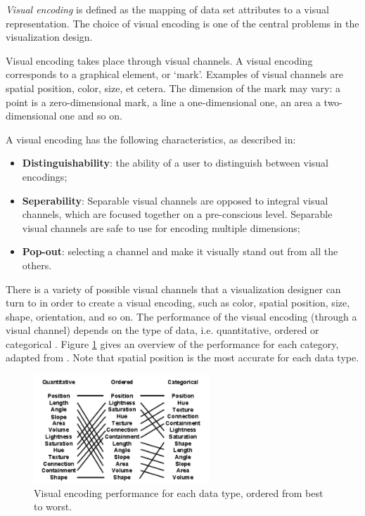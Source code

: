 \emph{Visual encoding} is defined as the mapping of data set attributes to a visual representation. The choice of visual encoding is one of the central problems in the visualization design\cite{shirley:2009}.

Visual encoding takes place through visual channels. A visual encoding corresponds to a graphical element, or ‘mark’. Examples of visual channels are spatial position, color, size, et cetera. The dimension of the mark may vary: a point is a zero-dimensional mark, a line a one-dimensional one, an area a two-dimensional one and so on.

A visual encoding has the following characteristics, as described in\cite{shirley:2009}:

\begin{itemize}
	\item \textbf{Distinguishability}: the ability of a user to distinguish between visual encodings;
	\item \textbf{Seperability}: Separable visual channels are opposed to integral visual channels, which are focused together on a pre-conscious level. Separable visual channels are safe to use for encoding multiple dimensions;
	\item \textbf{Pop-out}: selecting a channel and make it visually stand out from all the others.
\end{itemize}


There is a variety of possible visual channels that a visualization designer can turn to in order to create a visual encoding, such as color, spatial position, size, shape, orientation, and so on. The performance of the visual encoding (through a visual channel) depends on the type of data, i.e. quantitative, ordered or categorical \cite{shirley:2009}. Figure \ref{figure:encodings} gives an overview of the performance for each category, adapted from \cite{shirley:2009}. Note that spatial position is the most accurate for each data type.

\begin{figure}%
	\begin{center}
		\includegraphics[width=250px]{img/visualencodings}%
	\end{center}
	\caption{Visual encoding performance for each data type, ordered from best to worst.}%
	\label{figure:encodings}%
\end{figure}


